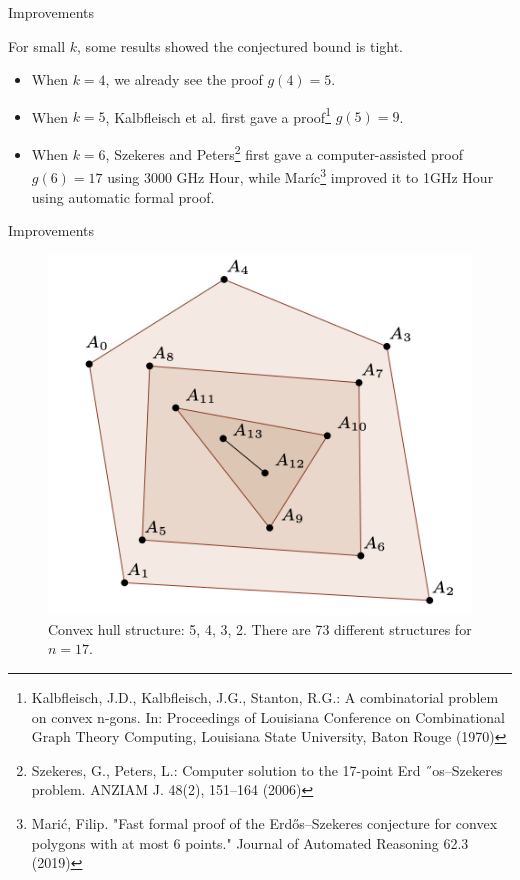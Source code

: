 \documentclass{beamer}
\begin{document}
\begin{frame}{Improvements}

For small $k$, some results showed the conjectured bound is tight.

\begin{itemize}
\item 
When $k=4$, we already see the proof $g(4) = 5$.
\item 
When $k=5$, Kalbfleisch et al. first gave a proof\footnote{Kalbfleisch, J.D., Kalbfleisch, J.G., Stanton, R.G.: A combinatorial problem on convex n-gons. In:
Proceedings of Louisiana Conference on Combinational Graph Theory Computing, Louisiana State University, Baton Rouge (1970)} $g(5) = 9$.
\item
When $k=6$, Szekeres and Peters\footnote{Szekeres, G., Peters, L.: Computer solution to the 17-point Erd ˝os–Szekeres problem. ANZIAM J. 48(2),
151–164 (2006)} first gave a computer-assisted proof $g(6) = 17$  using 3000 GHz Hour, while Mar\'ic\footnote{Marić, Filip. "Fast formal proof of the Erdős–Szekeres conjecture for convex polygons with at most 6 points." Journal of Automated Reasoning 62.3 (2019)} improved it to 1GHz Hour using automatic formal proof.
\end{itemize}


\end{frame}

\begin{frame}{Improvements}

\begin{figure}[r]
    \includegraphics[width=0.7\linewidth]{convex_hull_struct.png}
    \caption{Convex hull structure: 5, 4, 3, 2.  There are 73 different structures for $n=17$.}
    \label{figstruct}
\end{figure}

\end{frame}
\end{document}
